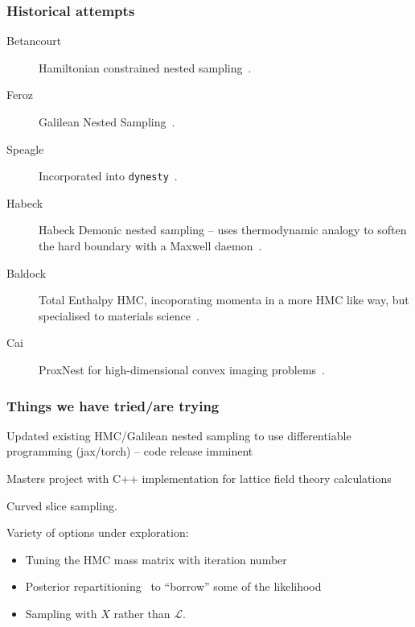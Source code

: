 \documentclass[aspectratio=169]{beamer}
\begin{document}
\begin{frame}
    \frametitle{Historical attempts}
    \begin{description}
        \item[Betancourt] Hamiltonian constrained nested sampling~.
        \item[Feroz] Galilean Nested Sampling~.
        \item[Speagle] Incorporated into \texttt{dynesty}~.
        \item[Habeck] Habeck Demonic nested sampling -- uses thermodynamic analogy to soften the hard boundary with a Maxwell daemon~.
        \item[Baldock] Total Enthalpy HMC, incoporating momenta in a more HMC like way, but specialised to materials science~.
        \item[Cai] ProxNest for high-dimensional convex imaging problems~.
    \end{description}
\end{frame}

\begin{frame}
    \frametitle{Things we have tried/are trying}
    \begin{description}
        \item[Pablo Lemos] Updated existing HMC/Galilean nested sampling to use differentiable programming (jax/torch) -- code release imminent
        \item[Boris Deletic] Masters project with C++ implementation for lattice field theory calculations
        \item[Stephen Thorpe] Curved slice sampling.
        \item[Sam Leeney] Variety of options under exploration:
            \begin{itemize}
                \item Tuning the HMC mass matrix with iteration number
                \item Posterior repartitioning~ to ``borrow'' some of the likelihood
                \item Sampling with $X$ rather than $\mathcal{L}$.
            \end{itemize}
    \end{description}
\end{frame}
\end{document}
